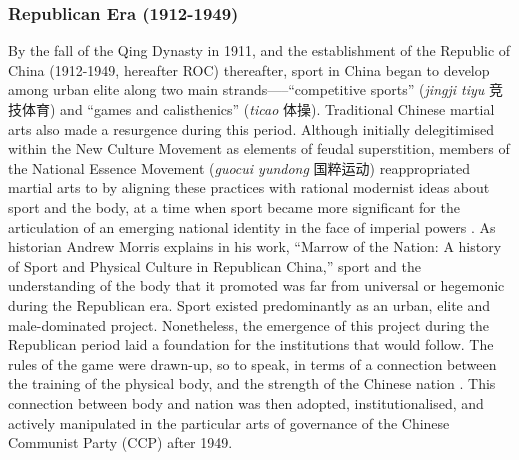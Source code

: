   \subsubsection{Republican Era (1912-1949)}
  By the fall of the Qing Dynasty in 1911, and the establishment of the Republic of China (1912-1949, hereafter ROC) thereafter, sport in China began to develop among urban elite along two main strands—--``competitive sports'' (\textit{jingji tiyu} 竞技体育) and ``games and calisthenics'' (\textit{ticao} 体操).  Traditional Chinese martial arts also made a resurgence during this period.  Although initially delegitimised within the New Culture Movement as elements of feudal superstition, members of the National Essence Movement (\textit{guocui yundong} 国粹运动) reappropriated martial arts to by aligning these practices with rational modernist ideas about sport and the body, at a time when sport became more significant for the articulation of an emerging national identity in the face of imperial powers \citep[38]{Brownell1995}\citep[45]{Morris2004}.  As historian Andrew Morris explains in his work, ``Marrow of the Nation: A history of Sport and Physical Culture in Republican China,'' sport and the understanding of the body that it promoted was far from universal or hegemonic during the Republican era.  Sport existed predominantly as an urban, elite and male-dominated project.  Nonetheless, the emergence of this project during the Republican period laid a foundation for the institutions that would follow.  The rules of the game were drawn-up, so to speak, in terms of a connection between the training of the physical body, and the strength of the Chinese nation \citep[140]{Morris2004}.  This connection between body and nation was then adopted, institutionalised, and actively manipulated in the particular arts of governance of the Chinese Communist Party (CCP) after 1949.

